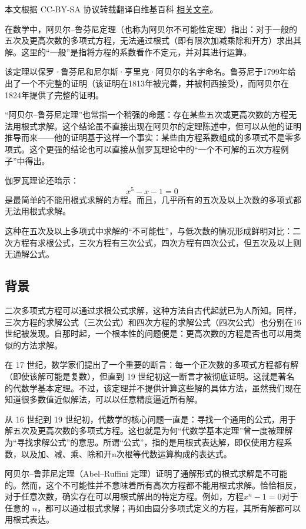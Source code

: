
本文根据 CC-BY-SA 协议转载翻译自维基百科 \href{https://en.wikipedia.org/wiki/Abel\%E2\%80\%93Ruffini_theorem}{相关文章}。

在数学中，阿贝尔–鲁芬尼定理（也称为阿贝尔不可能性定理）指出：对于一般的五次及更高次数的多项式方程，无法通过根式（即有限次加减乘除和开方）求出其解。这里的“一般”是指将方程的系数看作不定元，并对其进行运算。

该定理以保罗·鲁芬尼和尼尔斯·亨里克·阿贝尔的名字命名。鲁芬尼于1799年给出了一个不完整的证明（该证明在1813年被完善，并被柯西接受），而阿贝尔在1824年提供了完整的证明。

“阿贝尔–鲁芬尼定理”也常指一个稍强的命题：存在某些五次或更高次数的方程无法用根式求解。这个结论虽不直接出现在阿贝尔的定理陈述中，但可以从他的证明推导而来——他的证明基于这样一个事实：某些由方程系数组成的多项式不是零多项式。这个更强的结论也可以直接从伽罗瓦理论中的“一个不可解的五次方程例子”中得出。

伽罗瓦理论还暗示：
$$
x^5 - x - 1 = 0~
$$
是最简单的不能用根式求解的方程。而且，几乎所有的五次及以上次数的多项式都无法用根式求解。

这种在五次及以上多项式中求解的“不可能性”，与低次数的情况形成鲜明对比：二次方程有求根公式，三次方程有三次公式，四次方程有四次公式，但五次及以上则无通解公式。
\subsection{背景}
二次多项式方程可以通过求根公式求解，这种方法自古代起就已为人所知。同样，三次方程的求解公式（三次公式）和四次方程的求解公式（四次公式）也分别在16世纪被发现。自那时起，一个根本性的问题便是：更高次数的方程是否也可以用类似的方法求解。

在 17 世纪，数学家们提出了一个重要的断言：每一个正次数的多项式方程都有解（即使该解可能是复数），但直到 19 世纪初这一断言才被彻底证明。这就是著名的代数学基本定理。不过，该定理并不提供计算这些解的具体方法，虽然我们现在知道很多数值近似解法，可以以任意精度逼近所有解。

从 16 世纪到 19 世纪初，代数学的核心问题一直是：寻找一个通用的公式，用于解五次及更高次数的多项式方程。这也就是为何“代数学基本定理”曾一度被理解为“寻找求解公式”的意思。所谓“公式”，指的是用根式表达解，即仅使用方程系数，以及加、减、乘、除和开n次根等代数运算构成的表达式。

阿贝尔–鲁菲尼定理（Abel–Ruffini 定理）证明了通解形式的根式求解是不可能的。然而，这个不可能性并不意味着所有高次方程都不能用根式求解。恰恰相反，对于任意次数，确实存在可以用根式解出的特定方程。例如，方程$x^n - 1 = 0$对于任意的 $n$，都可以通过根式求解；再如由圆分多项式定义的方程，其所有解都可以用根式表达。

